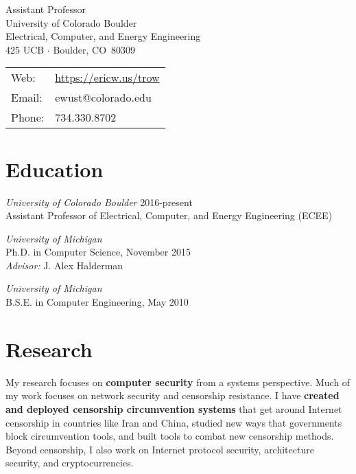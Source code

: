 \documentclass[margin,11pt]{res} %
\begin{document}
\begin{adjustwidth}{-1.3in}{0pt}
\vspace{20pt}

\noindent 
\parbox[m]{4in}{
Assistant Professor \\
University of Colorado Boulder\\
Electrical, Computer, and Energy Engineering\\
425 UCB $\cdot$ Boulder, CO \,80309
}
\begin{tabular}{ll}
{Web}:&\url{https://ericw.us/trow}\\
{Email}:&ewust@colorado.edu\\
{Phone}:& 734.330.8702
\end{tabular}
\vspace{10pt}
\end{adjustwidth}

\section{\large Education}

        \emph{University of Colorado Boulder} 2016-present\\
        Assistant Professor of Electrical, Computer, and Energy Engineering (ECEE)

        \emph{University of Michigan}\\
        Ph.D. in Computer Science, November 2015\\
        \emph{Advisor:} J. Alex Halderman

        \emph{University of Michigan}\\
        B.S.E. in Computer Engineering, May 2010

\vspace{6pt}
\section{\large Research}

My research focuses on \textbf{computer security} from a systems perspective.
Much of my work focuses on network security and censorship resistance.
I have \textbf{created and deployed censorship circumvention systems} that get around Internet
censorship in countries like Iran and China, studied new ways that governments
block circumvention tools, and built tools to combat new censorship methods.
Beyond censorship, I also work on Internet protocol security, architecture security, and cryptocurrencies.
\end{document}
